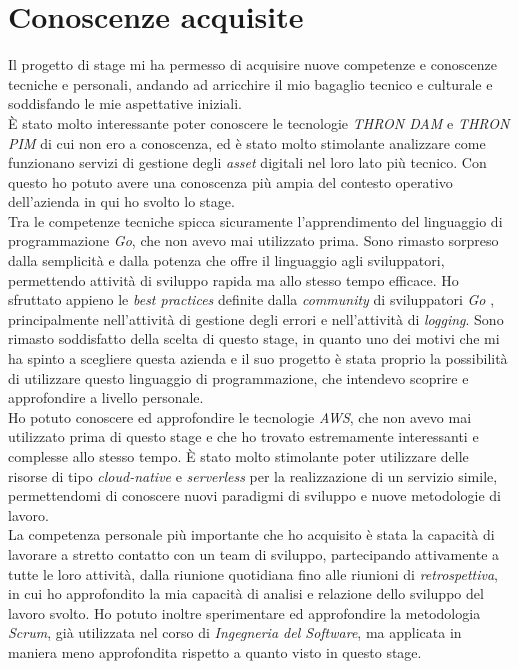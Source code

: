 \section{Conoscenze acquisite}
Il progetto di stage mi ha permesso di acquisire nuove competenze e conoscenze
tecniche e personali, andando ad arricchire il mio bagaglio tecnico e culturale
e soddisfando le mie aspettative iniziali.\\
È stato molto interessante poter conoscere le tecnologie \emph{THRON DAM} e
\emph{THRON PIM} di cui non ero a conoscenza, ed è stato molto stimolante
analizzare come funzionano servizi di gestione degli \emph{asset} digitali nel
loro lato più tecnico. Con questo ho potuto avere una conoscenza più ampia del
contesto operativo dell'azienda in qui ho svolto lo stage.\\
Tra le competenze tecniche spicca sicuramente l'apprendimento del linguaggio di
programmazione \emph{Go}, che non avevo mai utilizzato prima. Sono rimasto
sorpreso dalla semplicità e dalla potenza che offre il linguaggio agli
sviluppatori, permettendo attività di sviluppo rapida ma allo stesso tempo
efficace. Ho sfruttato appieno le \emph{best practices} definite dalla
\emph{community} di sviluppatori \emph{Go} \cite{effective-go}, principalmente nell'attività di
gestione degli errori e nell'attività di \emph{logging}. Sono rimasto
soddisfatto della scelta di questo stage, in quanto uno dei motivi che mi ha
spinto a scegliere questa azienda e il suo progetto è stata proprio la
possibilità di utilizzare questo linguaggio di programmazione, che intendevo
scoprire e approfondire a livello personale.\\
Ho potuto conoscere ed approfondire le tecnologie \emph{AWS}, che non avevo mai
utilizzato prima di questo stage e che ho trovato estremamente interessanti e
complesse allo stesso tempo. È stato molto stimolante poter utilizzare delle
risorse di tipo \emph{cloud-native} e \emph{serverless} per la realizzazione di
un servizio simile, permettendomi di conoscere nuovi paradigmi di sviluppo e
nuove metodologie di lavoro.\\
La competenza personale più importante che ho acquisito è stata la capacità di
lavorare a stretto contatto con un team di sviluppo, partecipando attivamente a
tutte le loro attività, dalla riunione quotidiana fino alle riunioni di
\emph{retrospettiva}, in cui ho approfondito la mia capacità di analisi e
relazione dello sviluppo del lavoro svolto. Ho potuto inoltre sperimentare ed
approfondire la metodologia \emph{Scrum}, già utilizzata nel corso di
\emph{Ingegneria del Software}, ma applicata in maniera meno approfondita
rispetto a quanto visto in questo stage.

